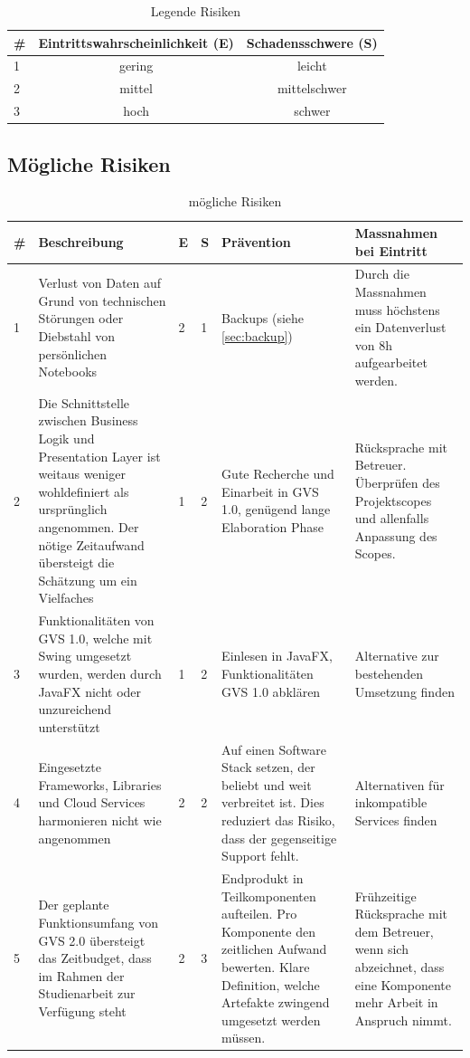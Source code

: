 \documentclass[11pt,a4paper,english,oneside]{book}
\numberwithin{equation}{chapter}
\begin{document}
	\begin{table}[h!]
		\centering
		\begin{tabular}{l c c}
			\toprule 
			\# & Eintrittswahrscheinlichkeit (E) & Schadensschwere (S) \\
			\toprule 
			1 & gering & leicht  \\
			2 & mittel & mittelschwer \\
			3 & hoch & schwer \\
			\bottomrule 
		\end{tabular} 
		\caption{Legende Risiken} 
	\end{table}
	\begin{landscape}		
		\subsection{Mögliche Risiken}
			\begin{table}[h!]
			\centering
			\begin{tabularx}{\linewidth}{l X l l X X}
				\toprule 
				\# & Beschreibung & E & S & Prävention & Massnahmen bei Eintritt \\
				\toprule 
				1 & Verlust von Daten auf Grund von technischen Störungen oder Diebstahl von persönlichen Notebooks & 2 & 1 & Backups (siehe \ref{sec:backup}) & Durch die Massnahmen muss höchstens ein Datenverlust von 8h aufgearbeitet werden. \\
				\midrule
				2 & Die Schnittstelle zwischen Business Logik und Presentation Layer ist weitaus weniger wohldefiniert als ursprünglich angenommen. Der nötige Zeitaufwand übersteigt die Schätzung um ein Vielfaches & 1 & 2 & Gute Recherche und Einarbeit in GVS 1.0, genügend lange Elaboration Phase & Rücksprache mit Betreuer. Überprüfen des Projektscopes und allenfalls Anpassung des Scopes. \\
				\midrule
				3 & Funktionalitäten von GVS 1.0, welche mit Swing umgesetzt wurden, werden durch JavaFX nicht oder unzureichend unterstützt & 1 & 2 & Einlesen in JavaFX, Funktionalitäten GVS 1.0 abklären & Alternative zur bestehenden Umsetzung finden \\
				\midrule
				4 & Eingesetzte Frameworks, Libraries und Cloud Services harmonieren nicht wie angenommen & 2 & 2 & Auf einen Software Stack setzen, der beliebt und weit verbreitet ist. Dies reduziert das Risiko, dass der gegenseitige Support fehlt. & Alternativen für inkompatible Services finden \\  
				\midrule 
				5 & Der geplante Funktionsumfang von GVS 2.0 übersteigt das Zeitbudget, dass im Rahmen der Studienarbeit zur Verfügung steht & 2 & 3 & Endprodukt in Teilkomponenten aufteilen. Pro Komponente den zeitlichen Aufwand bewerten. Klare Definition, welche Artefakte zwingend umgesetzt werden müssen. & Frühzeitige Rücksprache mit dem Betreuer, wenn sich abzeichnet, dass eine Komponente mehr Arbeit in Anspruch nimmt. \\  
				\bottomrule 
			\end{tabularx} 
			\caption{mögliche Risiken} 
		\end{table}
    \end{landscape}
\end{document}

